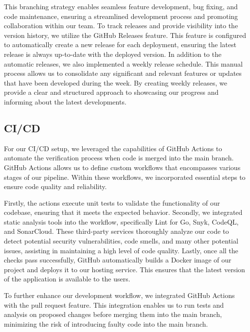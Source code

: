 This branching strategy enables seamless feature development, bug fixing, and code maintenance, ensuring a streamlined development process and promoting collaboration within our team. %
To track releases and provide visibility into the version history, we utilize the GitHub Releases feature. This feature is configured to automatically create a new release for each deployment, ensuring the latest release is always up-to-date with the deployed version. In addition to the automatic releases, we also implemented a weekly release schedule. This manual process allows us to consolidate any significant and relevant features or updates that have been developed during the week. By creating weekly releases, we provide a clear and structured approach to showcasing our progress and informing about the latest developments.


\subsection{CI/CD} \label{sec:cicd}

For our CI/CD setup, we leveraged the capabilities of GitHub Actions to automate the verification process when code is merged into the main branch. GitHub Actions allows us to define custom workflows that encompasses various stages of our pipeline. Within these workflows, we incorporated essential steps to ensure code quality and reliability.

Firstly, the actions execute unit tests to validate the functionality of our codebase, ensuring that it meets the expected behavior. Secondly, we integrated static analysis tools into the workflow, specifically Lint for Go, Snyk, CodeQL, and SonarCloud. These third-party services thoroughly analyze our code to detect potential security vulnerabilities, code smells, and many other potential issues, assisting in maintaining a high level of code quality. 
Lastly, once all the checks pass successfully, GitHub automatically builds a Docker image of our project and deploys it to our hosting service. This ensures that the latest version of the application is available to the users.

To further enhance our development workflow, we integrated GitHub Actions with the pull request feature. This integration enables us to run tests and analysis on proposed changes before merging them into the main branch, minimizing the risk of introducing faulty code into the main branch.

